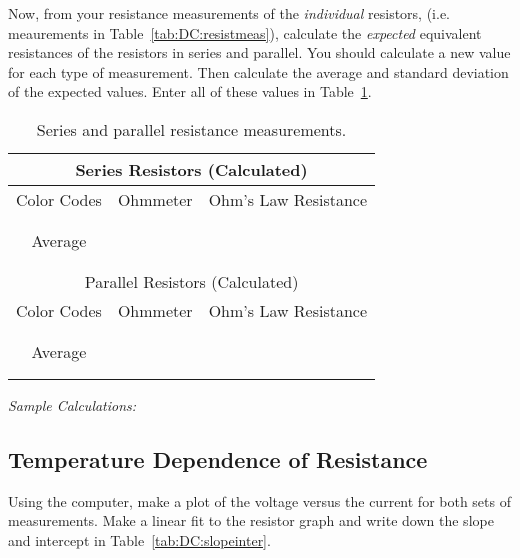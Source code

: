 \noindent
Now, from your resistance measurements of the {\it individual} resistors, 
(i.e. meaurements in Table~\ref{tab:DC:resistmeas}),
calculate the {\it expected} equivalent resistances of the resistors in 
series and parallel. You should calculate a new value for each type of
measurement.  
Then calculate the average and standard deviation of the expected values.
Enter all of these values in Table~\ref{tab:DC:calcserpar}. 

\begin{table}[htb]
\begin{center}
\begin{tabular}{|c|c|c|}
\hline
\multicolumn{3}{|c|}{Series Resistors (Calculated)} \\
\hline 
Color Codes & Ohmmeter & Ohm's Law Resistance \\
\hline
\hspace*{3cm} & \hspace*{3cm} & \hspace*{3cm} \\ 
& &  \\ 
\hline
Average &  & \\ 
\hline
& &  \\
& &  \\
\hline
\hline
\multicolumn{3}{|c|}{Parallel Resistors (Calculated)} \\
\hline 
Color Codes & Ohmmeter & Ohm's Law Resistance \\
\hline
\hspace*{3cm} & \hspace*{3cm} & \hspace*{3cm} \\ 
& &  \\ 
\hline
Average &  & \\
\hline
& &  \\
& &  \\
\hline
\hline
\end{tabular}
\end{center}
\caption{Series and parallel resistance measurements.}
\label{tab:DC:calcserpar}
\end{table}

\noindent
{\it Sample Calculations:}


\newpage

\subsection{Temperature Dependence of Resistance}

Using the computer, make a plot of the voltage versus the current for both 
sets of measurements. Make a linear fit to the resistor graph and write
down the slope and intercept in Table~\ref{tab:DC:slopeinter}.


